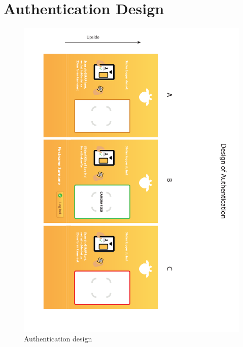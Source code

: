 \chapter{Authentication Design}
\label{app:design:authentication}
\begin{figure}[h!]
	\centering
	\includegraphics[width=\textwidth]{gfx/appendix_design_authentication.pdf}
	\caption{Authentication design}
	
\end{figure}